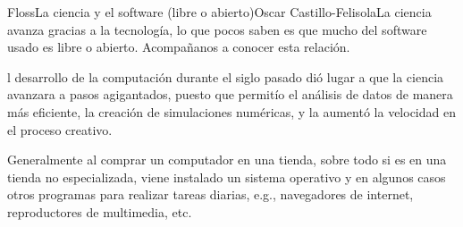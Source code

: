 

\begin{article}[2]{Floss}{La ciencia y el software (libre o abierto)}{Oscar Castillo-Felisola}{La ciencia avanza gracias a la tecnolog\'ia, lo que pocos saben es que mucho del software usado es libre o abierto. Acompa\~nanos a conocer esta relaci\'on.}
  
l desarrollo de la computaci\'on durante el siglo pasado di\'o lugar a que la ciencia avanzara a pasos agigantados, puesto que permit\'io el an\'alisis de datos de manera m\'as eficiente, la creaci\'on de simulaciones num\'ericas, y la aument\'o la velocidad en el proceso creativo.



Generalmente al comprar un computador en una tienda, sobre todo si es en una tienda no especializada, viene instalado un sistema operativo y en algunos casos otros programas para realizar tareas diarias, e.g., navegadores de internet, reproductores de multimedia, etc. 


\end{article}
